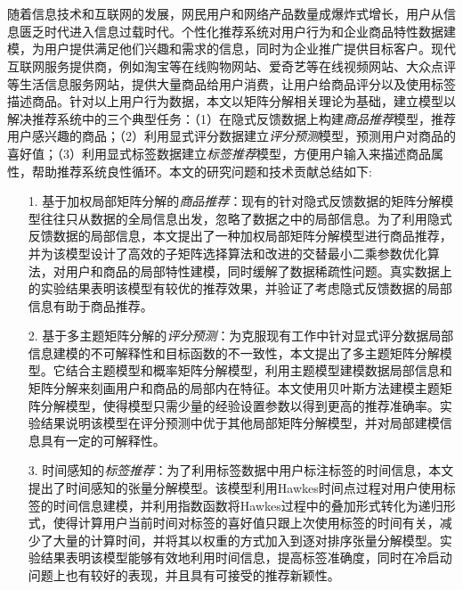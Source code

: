 \chapter*{}
随着信息技术和互联网的发展，网民用户和网络产品数量成爆炸式增长，用户从信息匮乏时代进入信息过载时代。个性化推荐系统对用户行为和企业商品特性数据建模，为用户提供满足他们兴趣和需求的信息，同时为企业推广提供目标客户。现代互联网服务提供商，例如淘宝等在线购物网站、爱奇艺等在线视频网站、大众点评等生活信息服务网站，提供大量商品给用户消费，让用户给商品评分以及使用标签描述商品。针对以上用户行为数据，本文以矩阵分解相关理论为基础，建立模型以解决推荐系统中的三个典型任务：（1）在隐式反馈数据上构建\textit{商品推荐}模型，推荐用户感兴趣的商品；（2）利用显式评分数据建立\textit{评分预测}模型，预测用户对商品的喜好值；（3）利用显式标签数据建立\textit{标签推荐}模型，方便用户输入来描述商品属性，帮助推荐系统良性循环。本文的研究问题和技术贡献总结如下:

\begin{itemize}
	\item[1.] 基于加权局部矩阵分解的\textit{商品推荐}：现有的针对隐式反馈数据的矩阵分解模型往往只从数据的全局信息出发，忽略了数据之中的局部信息。为了利用隐式反馈数据的局部信息，本文提出了一种加权局部矩阵分解模型进行商品推荐，并为该模型设计了高效的子矩阵选择算法和改进的交替最小二乘参数优化算法，对用户和商品的局部特性建模，同时缓解了数据稀疏性问题。真实数据上的实验结果表明该模型有较优的推荐效果，并验证了考虑隐式反馈数据的局部信息有助于商品推荐。
	
	\item[2.] 基于多主题矩阵分解的\textit{评分预测}：为克服现有工作中针对显式评分数据局部信息建模的不可解释性和目标函数的不一致性，本文提出了多主题矩阵分解模型。它结合主题模型和概率矩阵分解模型，利用主题模型建模数据局部信息和矩阵分解来刻画用户和商品的局部内在特征。本文使用贝叶斯方法建模主题矩阵分解模型，使得模型只需少量的经验设置参数以得到更高的推荐准确率。实验结果说明该模型在评分预测中优于其他局部矩阵分解模型，并对局部建模信息具有一定的可解释性。
	
	\item[3.] 时间感知的\textit{标签推荐}：为了利用标签数据中用户标注标签的时间信息，本文提出了时间感知的张量分解模型。该模型利用Hawkes时间点过程对用户使用标签的时间信息建模，并利用指数函数将Hawkes过程中的叠加形式转化为递归形式，使得计算用户当前时间对标签的喜好值只跟上次使用标签的时间有关，减少了大量的计算时间，并将其以权重的方式加入到逐对排序张量分解模型。实验结果表明该模型能够有效地利用时间信息，提高标签准确度，同时在冷启动问题上也有较好的表现，并且具有可接受的推荐新颖性。
\end{itemize}
\hspace{-0.5cm}
 
